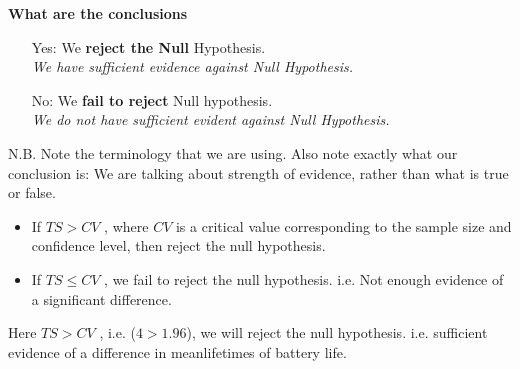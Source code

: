 \documentclass[a4paper,12pt]{article}
\begin{document}
\begin{framed}
\noindent \textbf{What are the conclusions}
\begin{itemize} 

\item[Yes:] We \textbf{reject the Null} Hypothesis. \\ \textit{We have sufficient evidence against Null Hypothesis.}

\item[No:] We \textbf{fail to reject} Null hypothesis. \\ \textit{We do not have sufficient evident against Null Hypothesis.}
\end{itemize}
{\normalsize
N.B. Note the terminology that we are using. Also note exactly what our conclusion is: We are talking about strength of evidence, rather than what is true or false.}

\end{framed}
\smallskip
\begin{framed}
\begin{itemize}
\item If $TS > CV$ , where $CV$ is a critical value corresponding to the sample size and confidence level, then reject the null hypothesis. 
\item  If $TS \leq CV$ , we fail to reject the null hypothesis. i.e. Not enough evidence of a significant difference. 
\end{itemize}
\end{framed}

\noindent Here $TS >CV$ , i.e. ($4 > 1.96$), we will reject the null hypothesis. i.e. sufficient evidence of a difference in meanlifetimes of battery life. 
\end{document}
